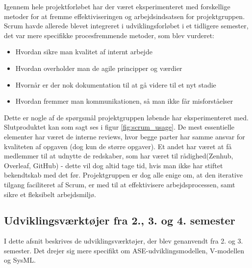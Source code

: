 \documentclass[a4paper,12pt,fleqn,oneside]{article}
\begin{document}
Igennem hele projektforløbet har der været eksperimenteret med forskellige metoder for at fremme effektiviseringen og arbejdsindsatsen for projektgruppen. Scrum havde allerede blevet integreret i udviklingsforløbet i et tidligere semester, det var mere specifikke procesfremmende metoder, som blev vurderet:
\begin{itemize}
    \item Hvordan sikre man kvalitet af internt arbejde
    \item Hvordan overholder man de agile principper og værdier
    \item Hvornår er der nok dokumentation til at gå videre til et nyt stadie
    \item Hvordan fremmer man kommunikationen, så man ikke får misforståelser 
\end{itemize}
Dette er nogle af de spørgsmål projektgruppen løbende har eksperimenteret med. Slutproduktet kan som sagt ses i figur \ref{fig:scrum_usage}. De mest essentielle elementer har været de interne reviews, hvor begge parter har samme ansvar for kvaliteten af opgaven (dog kun de større opgaver). Et andet har været at få medlemmer til at udnytte de redskaber, som har været til rådighed(Zenhub, Overleaf, GitHub) - dette vil dog altid tage tid, hvis man ikke har stiftet bekendtskab med det før. Projektgruppen er dog alle enige om, at den iterative tilgang faciliteret af Scrum, er med til at effektivisere arbejdsprocessen, samt sikre et fleksibelt arbejdsmiljø. 

\subsection{Udviklingsværktøjer fra 2., 3. og 4. semester}
I dette afsnit beskrives de udviklingsværktøjer, der blev genanvendt fra 2. og 3. semester. Det drejer sig mere specifikt om ASE-udviklingsmodellen, V-modellen og SysML.
\end{document}
